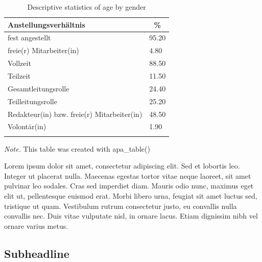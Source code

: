 \documentclass[floatsintext,man]{apa6}
\theoremstyle{definition}
\theoremstyle{definition}
\theoremstyle{definition}
\theoremstyle{remark}
\begin{document}
\begin{table}[tbp]
\begin{center}
\begin{threeparttable}
\caption{\label{tab:unnamed-chunk-2}Descriptive statistics of age by gender}
\small{
\begin{tabular}{ll}
\toprule
Anstellungsverhältnis & \multicolumn{1}{c}{\%}\\
\midrule
fest angestellt & 95.20\\
freie(r) Mitarbeiter(in) & 4.80\\ \midrule
Vollzeit & 88.50\\
Teilzeit & 11.50\\ \midrule
Gesamtleitungsrolle & 24.40\\
Teilleitungsrolle & 25.20\\
Redakteur(in) bzw. freie(r) Mitarbeiter(in) & 48.50\\
Volontär(in) & 1.90\\
\bottomrule
\addlinespace
\end{tabular}
}
\begin{tablenotes}[para]
\textit{Note.} This table was created with apa\_table()
\end{tablenotes}
\end{threeparttable}
\end{center}
\end{table}

Lorem ipsum dolor sit amet, consectetur adipiscing elit. Sed et lobortis
leo. Integer ut placerat nulla. Maecenas egestas tortor vitae neque
laoreet, sit amet pulvinar leo sodales. Cras sed imperdiet diam. Mauris
odio nunc, maximus eget elit ut, pellentesque euismod erat. Morbi libero
urna, feugiat sit amet luctus sed, tristique ut quam. Vestibulum rutrum
consectetur justo, eu convallis nulla convallis nec. Duis vitae
vulputate nisl, in ornare lacus. Etiam dignissim nibh vel ornare varius
metus.

\hypertarget{subheadline}{%
\subsection{Subheadline}\label{subheadline}}
\end{document}
